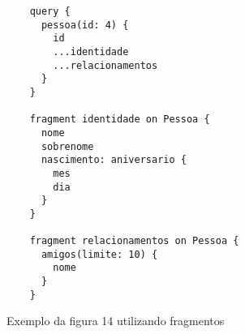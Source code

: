 \begin{figure}[H]
  \centering
  \begin{verbatim}
    query {
      pessoa(id: 4) {
        id
        ...identidade
        ...relacionamentos
      }
    }

    fragment identidade on Pessoa {
      nome
      sobrenome
      nascimento: aniversario {
        mes
        dia
      }
    }

    fragment relacionamentos on Pessoa {
      amigos(limite: 10) {
        nome
      }
    }
  \end{verbatim}
  \caption{Exemplo da figura 14 utilizando fragmentos}
\end{figure}
